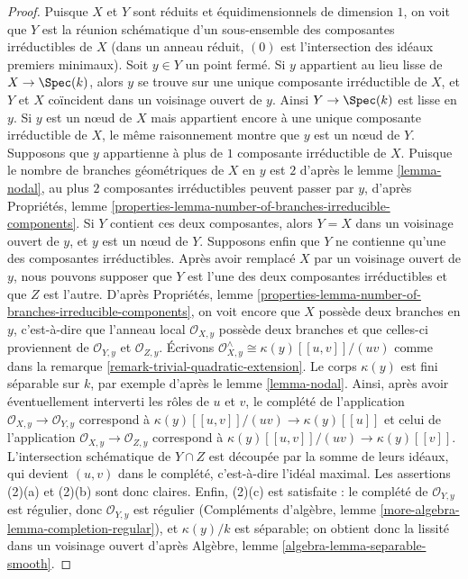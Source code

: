 \begin{proof}
Puisque $X$ et $Y$ sont réduits et équidimensionnels de dimension $1$, on voit que $Y$ est la réunion schématique d'un sous-ensemble des composantes irréductibles de $X$ (dans un anneau réduit, $(0)$ est l'intersection des idéaux premiers minimaux). Soit $y \in Y$ un point fermé. Si $y$ appartient au lieu lisse de $X \to \Spec(k)$, alors $y$ se trouve sur une unique composante irréductible de $X$, et $Y$ et $X$ coïncident dans un voisinage ouvert de $y$. Ainsi $Y \to \Spec(k)$ est lisse en $y$. Si $y$ est un nœud de $X$ mais appartient encore à une unique composante irréductible de $X$, le même raisonnement montre que $y$ est un nœud de $Y$. Supposons que $y$ appartienne à plus de $1$ composante irréductible de $X$. Puisque le nombre de branches géométriques de $X$ en $y$ est $2$ d'après le lemme \ref{lemma-nodal}, au plus $2$ composantes irréductibles peuvent passer par $y$, d'après Propriétés, lemme \ref{properties-lemma-number-of-branches-irreducible-components}. Si $Y$ contient ces deux composantes, alors $Y = X$ dans un voisinage ouvert de $y$, et $y$ est un nœud de $Y$. Supposons enfin que $Y$ ne contienne qu'une des composantes irréductibles. Après avoir remplacé $X$ par un voisinage ouvert de $y$, nous pouvons supposer que $Y$ est l'une des deux composantes irréductibles et que $Z$ est l'autre. D'après Propriétés, lemme \ref{properties-lemma-number-of-branches-irreducible-components}, on voit encore que $X$ possède deux branches en $y$, c'est-à-dire que l'anneau local $\mathcal{O}_{X, y}$ possède deux branches et que celles-ci proviennent de $\mathcal{O}_{Y, y}$ et $\mathcal{O}_{Z, y}$. Écrivons $\mathcal{O}_{X, y}^\wedge \cong \kappa(y)[[u, v]]/(uv)$ comme dans la remarque \ref{remark-trivial-quadratic-extension}. Le corps $\kappa(y)$ est fini séparable sur $k$, par exemple d'après le lemme \ref{lemma-nodal}. Ainsi, après avoir éventuellement interverti les rôles de $u$ et $v$, le complété de l'application $\mathcal{O}_{X, y} \to \mathcal{O}_{Y, y}$ correspond à $\kappa(y)[[u, v]]/(uv) \to \kappa(y)[[u]]$ et celui de l'application $\mathcal{O}_{X, y} \to \mathcal{O}_{Z, y}$ correspond à $\kappa(y)[[u, v]]/(uv) \to \kappa(y)[[v]]$. L'intersection schématique de $Y \cap Z$ est découpée par la somme de leurs idéaux, qui devient $(u, v)$ dans le complété, c'est-à-dire l'idéal maximal. Les assertions (2)(a) et (2)(b) sont donc claires. Enfin, (2)(c) est satisfaite : le complété de $\mathcal{O}_{Y, y}$ est régulier, donc $\mathcal{O}_{Y, y}$ est régulier (Compléments d'algèbre, lemme \ref{more-algebra-lemma-completion-regular}), et $\kappa(y)/k$ est séparable; on obtient donc la lissité dans un voisinage ouvert d'après Algèbre, lemme \ref{algebra-lemma-separable-smooth}.
\end{proof}




